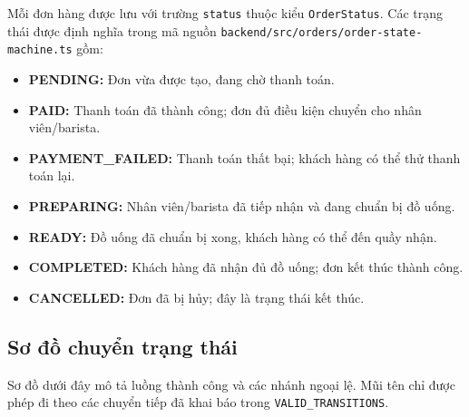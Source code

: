 Mỗi đơn hàng được lưu với trường \texttt{status} thuộc kiểu \texttt{OrderStatus}. Các trạng thái được định nghĩa trong mã nguồn \texttt{backend/src/orders/order-state-machine.ts} gồm:

\begin{itemize}
    \item \textbf{PENDING:} Đơn vừa được tạo, đang chờ thanh toán.
    \item \textbf{PAID:} Thanh toán đã thành công; đơn đủ điều kiện chuyển cho nhân viên/barista.
    \item \textbf{PAYMENT\_FAILED:} Thanh toán thất bại; khách hàng có thể thử thanh toán lại.
    \item \textbf{PREPARING:} Nhân viên/barista đã tiếp nhận và đang chuẩn bị đồ uống.
    \item \textbf{READY:} Đồ uống đã chuẩn bị xong, khách hàng có thể đến quầy nhận.
    \item \textbf{COMPLETED:} Khách hàng đã nhận đủ đồ uống; đơn kết thúc thành công.
    \item \textbf{CANCELLED:} Đơn đã bị hủy; đây là trạng thái kết thúc.
\end{itemize}

\subsection{Sơ đồ chuyển trạng thái}

Sơ đồ dưới đây mô tả luồng thành công và các nhánh ngoại lệ. Mũi tên chỉ được phép đi theo các chuyển tiếp đã khai báo trong \texttt{VALID\_TRANSITIONS}.

